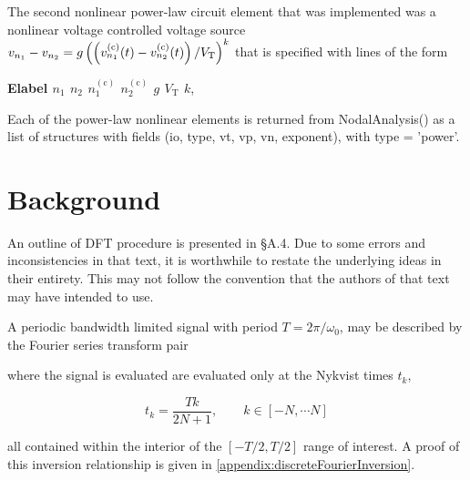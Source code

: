 The second nonlinear power-law circuit element that was implemented was a nonlinear voltage controlled voltage source 
\( v_{n_1} - v_{n_2} = g \left( \left(v_{n_1}^{(\textrm{c})}(t) - v_{n_2}^{(\textrm{c})}(t)\right)/V_{\textrm{T}}\right)^k \)
that is specified with lines of the form

\begin{center}
\textbf{Elabel \(n_1\) \(n_2\) \(n^{(\textrm{c})}_1\) \(n^{(\textrm{c})}_2\) \(g\) \(V_{\textrm{T}}\) \( k \)},
\end{center}

Each of the power-law nonlinear elements is returned from NodalAnalysis() as a list of structures with fields (io, type, vt, vp, vn, exponent), with type = 'power'.

\section{Background}

An outline of DFT procedure is presented in \citep{giannini2004NonlinearMicrowaveCircuitDesign} \S A.4.  Due to some errors and inconsistencies in that text, it is worthwhile to restate the underlying ideas in their entirety.  This may not follow the convention that the authors of that text may have intended to use.

A periodic bandwidth limited signal with period \( T = 2 \pi/\omega_0 \), may be described by the Fourier series transform pair


where the signal is evaluated are evaluated only at the Nykvist times
\( t_k \),

\begin{equation}\label{eqn:ece1254projectReport:20}
t_k = \frac{T k}{2 N + 1}, \qquad k \in [-N, \cdots N]
\end{equation}

all contained within the interior of the \( [-T/2, T/2] \) range of interest.
A proof of this inversion relationship is given in \cref{appendix:discreteFourierInversion}.

